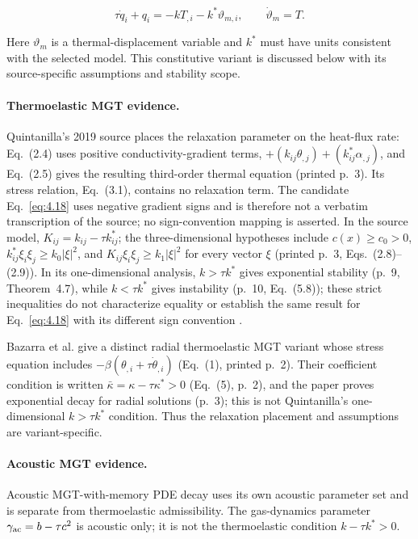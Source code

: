 \begin{equation}
\tau\dot{q}_i+q_i=-kT_{,i}-k^*\vartheta_{m,i},\qquad \dot{\vartheta}_m=T.
\label{eq:4.18}
\end{equation}

Here $\vartheta_m$ is a thermal-displacement variable and $k^*$ must have units consistent with the selected model. This constitutive variant is discussed below with its source-specific assumptions and stability scope.

\paragraph{Thermoelastic MGT evidence.}

Quintanilla's 2019 source places the relaxation parameter on the heat-flux rate: Eq.~(2.4) uses positive conductivity-gradient terms, $+(k_{ij}\theta_{,j})+(k^*_{ij}\alpha_{,j})$, and Eq.~(2.5) gives the resulting third-order thermal equation (printed p.~3). Its stress relation, Eq.~(3.1), contains no relaxation term. The candidate Eq.~\eqref{eq:4.18} uses negative gradient signs and is therefore not a verbatim transcription of the source; no sign-convention mapping is asserted. In the source model, $K_{ij}=k_{ij}-\tau k^*_{ij}$; the three-dimensional hypotheses include $c(x)\geq c_0>0$, $k^*_{ij}\xi_i\xi_j\geq k_0|\xi|^2$, and $K_{ij}\xi_i\xi_j\geq k_1|\xi|^2$ for every vector $\xi$ (printed p.~3, Eqs.~(2.8)--(2.9)). In its one-dimensional analysis, $k>\tau k^*$ gives exponential stability (p.~9, Theorem~4.7), while $k<\tau k^*$ gives instability (p.~10, Eq.~(5.8)); these strict inequalities do not characterize equality or establish the same result for Eq.~\eqref{eq:4.18} with its different sign convention \cite{Quintanilla2019}.

Bazarra et al. give a distinct radial thermoelastic MGT variant whose stress equation includes $-\beta(\theta_{,i}+\tau\dot{\theta}_{,i})$ (Eq.~(1), printed p.~2). Their coefficient condition is written $\bar{\kappa}=\kappa-\tau\kappa^*>0$ (Eq.~(5), p.~2), and the paper proves exponential decay for radial solutions (p.~3); this is not Quintanilla's one-dimensional $k>\tau k^*$ condition. Thus the relaxation placement and assumptions are variant-specific.

\paragraph{Acoustic MGT evidence.} Acoustic MGT-with-memory PDE decay uses its own acoustic parameter set and is separate from thermoelastic admissibility. The gas-dynamics parameter $\gamma_{\rm ac}=b-\tau c^2$ is acoustic only; it is not the thermoelastic condition $k-\tau k^*>0$.

